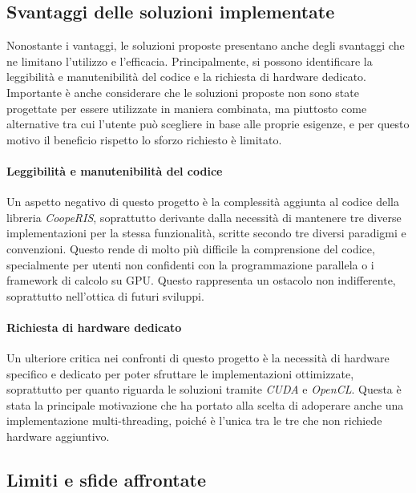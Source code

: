 \subsection{Svantaggi delle soluzioni implementate}
\label{sec:svantaggi}

Nonostante i vantaggi, le soluzioni proposte presentano anche degli svantaggi
che ne limitano l'utilizzo e l'efficacia. Principalmente, si possono
identificare la leggibilità e manutenibilità del codice e la richiesta di
hardware dedicato. Importante è anche considerare che le soluzioni proposte non sono
state progettate per essere utilizzate in maniera combinata, ma piuttosto come
alternative tra cui l'utente può scegliere in base alle proprie esigenze, e per questo
motivo il beneficio rispetto lo sforzo richiesto è limitato.

\paragraph{Leggibilità e manutenibilità del codice}
\label{para:leggibilita}

Un aspetto negativo di questo progetto è la complessità aggiunta al codice della
libreria \textit{CoopeRIS}, soprattutto derivante dalla necessità di mantenere tre
diverse implementazioni per la stessa funzionalità, scritte secondo tre diversi
paradigmi e convenzioni. Questo rende di molto più difficile la comprensione del
codice, specialmente per utenti non confidenti con la programmazione parallela o
i framework di calcolo su GPU. Questo rappresenta un ostacolo non indifferente,
soprattutto nell'ottica di futuri sviluppi.

\paragraph{Richiesta di hardware dedicato}
\label{para:hardware}

Un ulteriore critica nei confronti di questo progetto è la necessità di hardware
specifico e dedicato per poter sfruttare le implementazioni ottimizzate, soprattutto
per quanto riguarda le soluzioni tramite \textit{CUDA} e \textit{OpenCL}. Questa
è stata la principale motivazione che ha portato alla scelta di adoperare anche
una implementazione multi-threading, poiché è l'unica tra le tre che non richiede
hardware aggiuntivo.

\subsection{Limiti e sfide affrontate}
\label{subsec:limiti}

